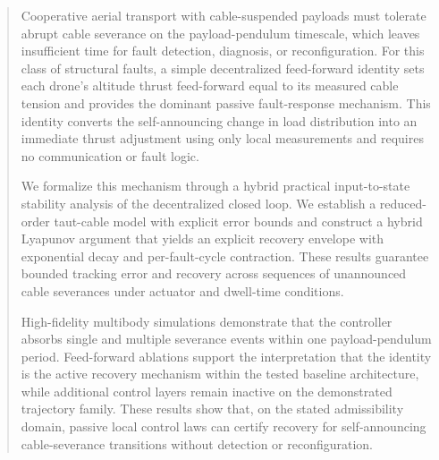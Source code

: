 \documentclass[lettersize,journal]{IEEEtran}
\begin{document}
\begin{abstract}
Cooperative aerial transport with cable-suspended payloads must tolerate abrupt cable severance on the payload-pendulum timescale, which leaves insufficient time for fault detection, diagnosis, or reconfiguration. For this class of structural faults, a simple decentralized feed-forward identity sets each drone’s altitude thrust feed-forward equal to its measured cable tension and provides the dominant passive fault-response mechanism. This identity converts the self-announcing change in load distribution into an immediate thrust adjustment using only local measurements and requires no communication or fault logic.

We formalize this mechanism through a hybrid practical input-to-state stability analysis of the decentralized closed loop. We establish a reduced-order taut-cable model with explicit error bounds and construct a hybrid Lyapunov argument that yields an explicit recovery envelope with exponential decay and per-fault-cycle contraction. These results guarantee bounded tracking error and recovery across sequences of unannounced cable severances under actuator and dwell-time conditions.

High-fidelity multibody simulations demonstrate that the controller absorbs single and multiple severance events within one payload-pendulum period. Feed-forward ablations support the interpretation that the identity is the active recovery mechanism within the tested baseline architecture, while additional control layers remain inactive on the demonstrated trajectory family. These results show that, on the stated admissibility domain, passive local control laws can certify recovery for self-announcing cable-severance transitions without detection or reconfiguration.
\end{abstract}
\end{document}
